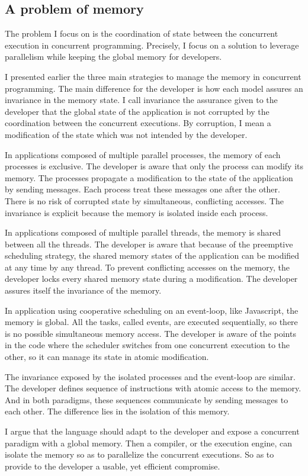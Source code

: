\subsection{A problem of memory}

The problem I focus on is the coordination of state between the concurrent execution in concurrent programming.
Precisely, I focus on a solution to leverage parallelism while keeping the global memory for developers.

I presented earlier the three main strategies to manage the memory in concurrent programming.
The main difference for the developer is how each model assures an invariance in the memory state.
I call invariance the assurance given to the developer that the global state of the application is not corrupted by the coordination between the concurrent executions.
By corruption, I mean a modification of the state which was not intended by the developer.

In applications composed of multiple parallel processes, the memory of each processes is exclusive.
The developer is aware that only the process can modify its memory.
The processes propagate a modification to the state of the application by sending messages.
Each process treat these messages one after the other.
There is no risk of corrupted state by simultaneous, conflicting accesses.
The invariance is explicit because the memory is isolated inside each process.

In applications composed of multiple parallel threads, the memory is shared between all the threads.
The developer is aware that because of the preemptive scheduling strategy, the shared memory states of the application can be modified at any time by any thread.
To prevent conflicting accesses on the memory, the developer locks every shared memory state during a modification.
The developer assures itself the invariance of the memory.

In application using cooperative scheduling on an event-loop, like Javascript, the memory is global.
All the tasks, called events, are executed sequentially, so there is no possible simultaneous memory access.
The developer is aware of the points in the code where the scheduler switches from one concurrent execution to the other, so it can manage its state in atomic modification.

The invariance exposed by the isolated processes and the event-loop are similar.
The developer defines sequence of instructions with atomic access to the memory.
And in both paradigms, these sequences communicate by sending messages to each other.
The difference lies in the isolation of this memory.

I argue that the language should adapt to the developer and expose a concurrent paradigm with a global memory.
Then a compiler, or the execution engine, can isolate the memory so as to parallelize the concurrent executions.
So as to provide to the developer a usable, yet efficient compromise.